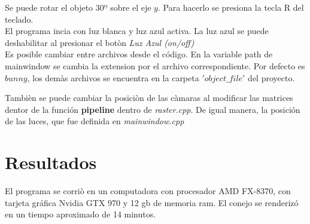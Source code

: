 \documentclass[12pt]{article}
\begin{document}
 

Se puede rotar el objeto $30º$ sobre el eje $y$. Para hacerlo se presiona la tecla R del teclado.
\\

El programa incia con luz blanca y luz azul activa. La luz azul se puede deshabilitar al presionar el botòn \textit{Luz Azul (on/off)}
\\


Es posible cambiar entre archivos desde el código. En la variable path de mainwindow se cambia la extension por el archivo correspondiente. Por defecto es $bunny$, los demàs archivos se encuentra en la carpeta $'object\_file'$ del proyecto.

Tambièn se puede cambiar la posiciòn de las càmaras al modificar las matrices dentor de la función \textbf{pipeline} dentro de \textit{raster.cpp}. De igual manera, la posición de las luces, que fue definida en \textit{mainwindow.cpp}


\section{Resultados}

El programa se corriò en un computadora con procesador AMD FX-8370, con tarjeta gráfica Nvidia GTX 970 y 12 gb de memoria ram. El conejo se renderizó en un tiempo aproximado de 14 minutos.
\end{document}
